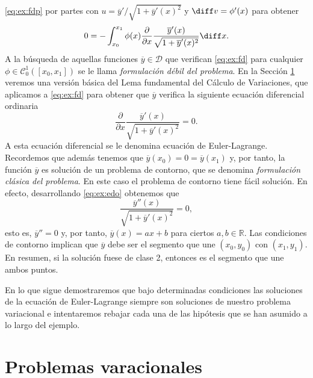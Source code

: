 \documentclass{article}
\begin{document}
\begin{ex}
  \eqref{eq:ex:fdp} por partes con $u = \overline{y}'/\sqrt{1 + \overline{y}'(x)^2}$ y
  $\diff v = \phi'(x)$ para obtener
  \begin{equation} \label{eq:ex:fd} 0 = -\int_{x_0}^{x_1} \phi(x) \frac{\partial}{\partial
      x}\frac{\overline{y}'(x)}{\sqrt{1 + \overline{y}'(x)^2}} \diff x.
  \end{equation}
  A la búsqueda de aquellas funciones $\overline{y} \in \mathcal{D}$ que verifican \eqref{eq:ex:fd}
  para cualquier $\phi \in \mathcal{C}^1_0([x_0, x_1])$ se le llama \emph{formulación débil del
    problema}. En la Sección \ref{sec:pv} veremos una versión básica del Lema fundamental del Cálculo de
  Variaciones, que aplicamos a \eqref{eq:ex:fd} para obtener que $\overline{y}$ verifica la
  siguiente ecuación diferencial ordinaria
  \begin{equation} \label{eq:ex:edo} \frac{\partial}{\partial x}\frac{\overline{y}'(x)}{\sqrt{1 +
        \overline{y}'(x)^2}} = 0.
  \end{equation}
  A esta ecuación diferencial se le denomina ecuación de Euler-Lagrange. Recordemos que además
  tenemos que $\overline{y}(x_0) = 0 = \overline{y}(x_1)$ y, por tanto, la función $\overline{y}$ es
  solución de un problema de contorno, que se denomina \emph{formulación clásica del problema}. En
  este caso el problema de contorno tiene fácil solución. En efecto, desarrollando \eqref{eq:ex:edo}
  obtenemos que
  \[\frac{\overline{y}''(x)}{\sqrt{1 + \overline{y}'(x)^2}} = 0,\]
  esto es, $\overline{y}'' = 0$ y, por tanto, $\overline{y}(x) = ax+b$ para ciertos
  $a, b \in \mathbb{R}$. Las condiciones de contorno implican que $\overline{y}$ debe ser el
  segmento que une $(x_0, y_0)$ con $(x_1, y_1)$. En resumen, si la solución fuese de clase 2,
  entonces es el segmento que une ambos puntos.
\end{ex}

En lo que sigue demostraremos que bajo determinadas condiciones las soluciones de la ecuación de
Euler-Lagrange siempre son soluciones de nuestro problema variacional e intentaremos rebajar cada
una de las hipótesis que se han asumido a lo largo del ejemplo.
  
\section{Problemas varacionales} \label{sec:pv}
\end{document}

